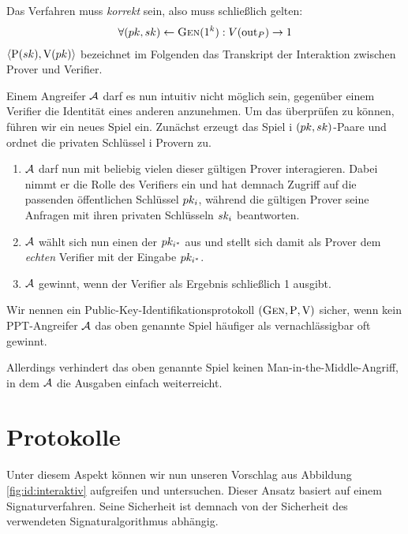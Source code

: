 Das Verfahren muss \emph{korrekt} sein, also muss schließlich gelten:
\begin{align*} \forall (pk, sk) \leftarrow \textsc{Gen}(1^k):
V(\mathrm{out}_P) \rightarrow 1
\end{align*} $\langle \mathrm{P}(sk), \mathrm{V}(pk) \rangle$
bezeichnet im Folgenden das Transkript der Interaktion zwischen Prover
und Verifier.

Einem Angreifer $\mathcal{A}$ darf es nun intuitiv nicht möglich sein, gegenüber
einem Verifier die Identität eines anderen anzunehmen. Um das überprüfen
zu können, führen wir ein neues Spiel ein. Zunächst erzeugt das Spiel i
$(pk, sk)$-Paare und ordnet die privaten Schlüssel i Provern zu.
\begin{enumerate}
  \item $\mathcal{A}$ darf nun mit beliebig vielen dieser gültigen Prover
interagieren. Dabei nimmt er die Rolle des Verifiers ein und hat demnach
Zugriff auf die passenden öffentlichen Schlüssel $pk_i$, während die
gültigen Prover seine Anfragen mit ihren privaten Schlüsseln $sk_i$
beantworten.
  \item $\mathcal{A}$ wählt sich nun einen der $pk_{i^*}$ aus und stellt sich
damit als Prover dem \emph{echten} Verifier mit der Eingabe
$pk_{i^*}$.
  \item $\mathcal{A}$ gewinnt, wenn der Verifier als Ergebnis schließlich 1
ausgibt.
\end{enumerate} Wir nennen ein Public-Key-Identifikationsprotokoll
$(\textsc{Gen}, \mathrm{P}, \mathrm{V})$ sicher, wenn kein PPT-Angreifer $\mathcal{A}$
das oben genannte Spiel häufiger als vernachlässigbar oft gewinnt.

Allerdings verhindert das oben genannte Spiel keinen
Man-in-the-Middle-Angriff, in dem $\mathcal{A}$ die Ausgaben einfach
weiterreicht.


\section{Protokolle} Unter diesem Aspekt können wir nun unseren
Vorschlag aus Abbildung \ref{fig:id:interaktiv} aufgreifen und
untersuchen. Dieser Ansatz basiert auf einem Signaturverfahren. Seine
Sicherheit ist demnach von der Sicherheit des verwendeten
Signaturalgorithmus abhängig.~\\

